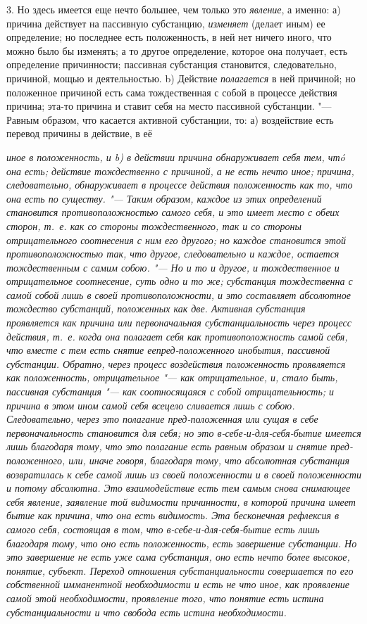 3. Но здесь имеется еще нечто большее, чем только это {\em явление}, а именно:
а) причина действует на пассивную субстанцию, {\em изменяет} (делает
иным) ее определение; но последнее есть положенность, в ней нет ничего
иного, что можно было бы изменять; а то другое определение, которое она
получает, есть определение причинности; пассивная субстанция становится,
следовательно, причиной, мощью и деятельностью. b) Действие {\em полагается}
в ней причиной; но положенное причиной есть сама тождественная с собой в
процессе действия причина; эта-то причина и ставит себя на место пассивной
субстанции. "--- Равным образом, что касается активной субстанции, то:
а) воздействие есть перевод причины в действие, в её {\em иное в
положенность, и b) в действии причина обнаруживает себя тем, чтó она есть;
действие тождественно с причиной, а не есть нечто иное; причина,
следовательно, обнаруживает в процессе действия положенность как то, что
она есть по существу. "--- Таким образом, каждое из этих
определений становится {\em противоположностью}
самого себя, и это имеет место с обеих сторон, т.~е. как со стороны
тождественного, так и со стороны отрицательного {\em соотнесения с ним его
другого}; но каждое становится этой противоположностью так, что другое,
следовательно и каждое, остается {\em тождественным с самим собою}. "--- Но и
то и другое, и тождественное и отрицательное соотнесение, суть одно и то же;
субстанция тождественна с самой собой лишь в своей противоположности, и это
составляет абсолютное тождество субстанций, положенных как две. Активная
субстанция проявляется как причина или первоначальная субстанциальность
через процесс действия, т.~е. когда она полагает себя как противоположность
самой себя, что вместе с тем есть снятие ее{\em пред-положенного инобытия},
пассивной субстанции. Обратно, через процесс воздействия положенность
проявляется {\em как} положенность, отрицательное "--- {\em как} отрицательное,
и, стало быть, пассивная субстанция "--- как {\em соотносящаяся с собой}
отрицательность; и причина в этом ином самой себя всецело сливается лишь с
собою. Следовательно, через это полагание {\em пред-положенная} или
{\em сущая в себе} первоначальность становится {\em для себя}; но это
в-себе-и-для-себя-бытие имеется лишь благодаря тому, что это полагание есть
равным образом и {\em снятие} пред-положенного, или, иначе говоря, благодаря
тому, что абсолютная субстанция возвратилась к себе самой лишь {\em из своей
положенности} и {\em в своей положенности} и потому абсолютна. Это
взаимодействие есть тем самым снова снимающее себя явление, заявление той
{\em видимости} причинности, в которой причина имеет бытие {\em как} причина,
{\em что она есть видимость}. Эта бесконечная рефлексия в самого себя,
состоящая в том, что в-себе-и-для-себя-бытие есть лишь благодаря тому, что
оно есть положенность, есть {\em завершение субстанции}. Но это завершение
не есть уже сама {\em субстанция}, оно есть нечто более высокое, {\em понятие},
{\em субъект}. Переход отношения субстанциальности совершается по его
собственной имманентной необходимости и есть не что иное, как проявление
самой этой необходимости, проявление того, что понятие есть истина
субстанциальности и что свобода есть истина необходимости.

}
